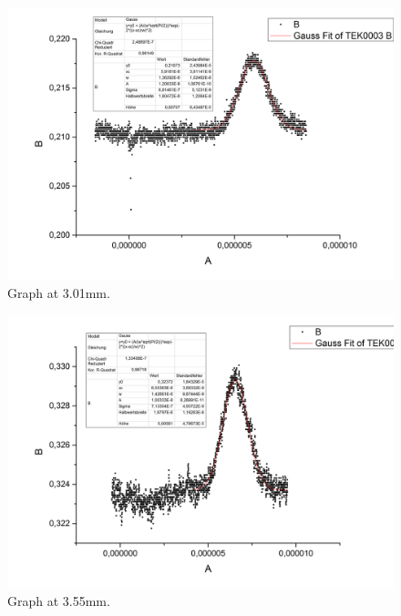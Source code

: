 \begin{figure}[h]
\begin{center}
\includegraphics[scale=0.25]{Bilder/Teil2/Graph3}
\caption{Graph at 3.01mm.}
\label{fig:graph3}
\end{center}
\end{figure}
\begin{figure}[h]
\begin{center}
\includegraphics[scale=0.25]{Bilder/Teil2/Graph4}
\caption{Graph at 3.55mm.}
\label{fig:graph4}
\end{center}
\end{figure}
